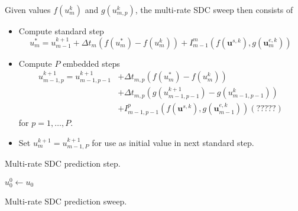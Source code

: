 \documentclass{article}
\newcommand{\ve}[1]{\mathbf{#1}}
\begin{document}
Given values $f(u^k_m)$ and $g(u^k_{m,p})$, the multi-rate SDC sweep then consists of
\begin{itemize}
\item Compute standard step
	\begin{equation}
		u^{*}_{m} = u^{k+1}_{m-1} + \Delta t_m \left( f(u^{*}_{m}) - f(u^k_{m}) \right) + I_{m-1}^{m} \left( f(\ve{u}^{s,k}) , g(\ve{u}^{e,k}_m) \right)
	\end{equation}
\item Compute $P$ embedded steps
	\begin{align*}
		u_{m-1,p}^{k+1} = u_{m-1,p-1}^{k+1} &+ \Delta t_{m,p} \left( f(u^{*}_{m}) - f(u^k_{m}) \right) \\
			& + \Delta t_{m,p} \left( g(u^{k+1}_{m-1,p-1}) - g(u^k_{m-1,p-1}) \right) \\
			& + I_{m-1,p-1}^{p}  \left( f(\ve{u}^{s,k}) , g(\ve{u}^{e,k}_{m-1}) \right) (?????)
	\end{align*}
	for $p=1, \ldots, P$.
\item Set $u_{m}^{k+1} = u_{m-1,P}^{k+1}$ for use as initial value in next standard step.
\end{itemize}
%
%
%
\begin{algorithm2e}
	\caption{Multi-rate SDC prediction step.}
         $u^0_0 \leftarrow u_0$\\
\end{algorithm2e}
%
%
%
\begin{algorithm2e}
	\caption{Multi-rate SDC prediction sweep.}
         \Input{}
         \Output{}
\end{algorithm2e}
%
%
%
\end{document}
